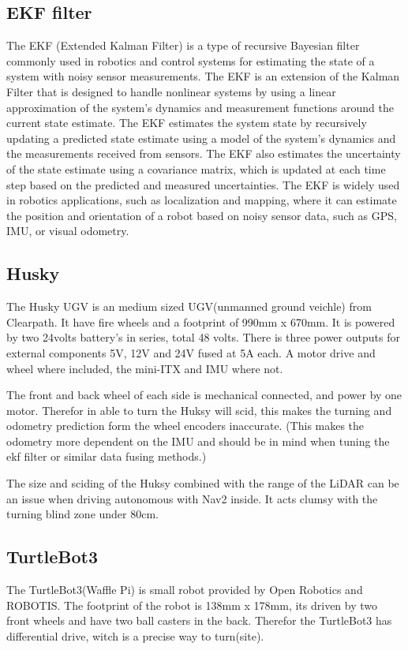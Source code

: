\subsection{EKF filter}
The EKF (Extended Kalman Filter) is a type of recursive Bayesian filter commonly used in robotics and control systems for estimating the state of a system with noisy sensor measurements. The EKF is an extension of the Kalman Filter that is designed to handle nonlinear systems by using a linear approximation of the system's dynamics and measurement functions around the current state estimate. The EKF estimates the system state by recursively updating a predicted state estimate using a model of the system's dynamics and the measurements received from sensors. The EKF also estimates the uncertainty of the state estimate using a covariance matrix, which is updated at each time step based on the predicted and measured uncertainties. The EKF is widely used in robotics applications, such as localization and mapping, where it can estimate the position and orientation of a robot based on noisy sensor data, such as GPS, IMU, or visual odometry.

\subsection{Husky}
The Husky UGV is an medium sized UGV(unmanned ground veichle) from Clearpath. It have fire wheels and a footprint of 990mm x 670mm. It is powered by two 24volts battery's in series, total 48 volts. There is three power outputs for external components 5V, 12V and 24V fused at 5A each. A motor drive and wheel where included, the mini-ITX and IMU where not. 

The front and back wheel of each side is mechanical connected, and power by one motor. Therefor in able to turn the Huksy will scid, this makes the turning and odometry prediction form the wheel encoders inaccurate. 
(This makes the odometry more dependent on the IMU and should be in mind when tuning the ekf filter or similar data fusing methods.) 

The size and sciding of the Huksy combined with the range of the LiDAR can be an issue when driving autonomous with Nav2 inside. It acts clumsy with the turning blind zone under 80cm. 

\subsection{TurtleBot3}
The TurtleBot3(Waffle Pi) is small robot provided by Open Robotics and ROBOTIS. The footprint of the robot is 138mm x 178mm, its driven by two front wheels and have two ball casters in the back. Therefor the TurtleBot3 has differential drive, witch is a precise way to turn(site). 

